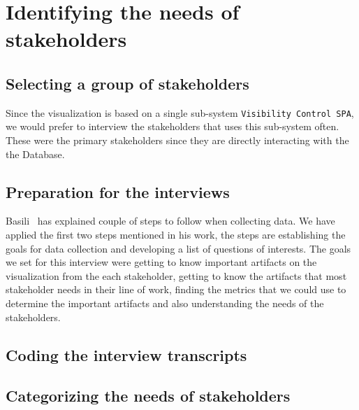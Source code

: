 \section{Identifying the needs of stakeholders}
 
\subsection{Selecting a group of stakeholders}
Since the visualization is based on a single sub-system \texttt{Visibility Control SPA}, we would prefer to interview the stakeholders that uses this sub-system often. These were the primary stakeholders since they are directly interacting with the the Database.


\subsection{Preparation for the interviews}
Basili~\cite{Basili} has explained couple of steps to follow when collecting data. We have applied the first two steps mentioned in his work, the steps are establishing the goals for data collection and developing a list of questions of interests. The goals we set for this interview were getting to know important artifacts on the visualization from the each stakeholder, getting to know the artifacts that most stakeholder needs in their line of work, finding the metrics that we could use to determine the important artifacts and also understanding the needs of the stakeholders.

\subsection{Coding the interview transcripts}
\label{IM:coding_the_interview_transcripts}

\subsection{Categorizing the needs of stakeholders}
